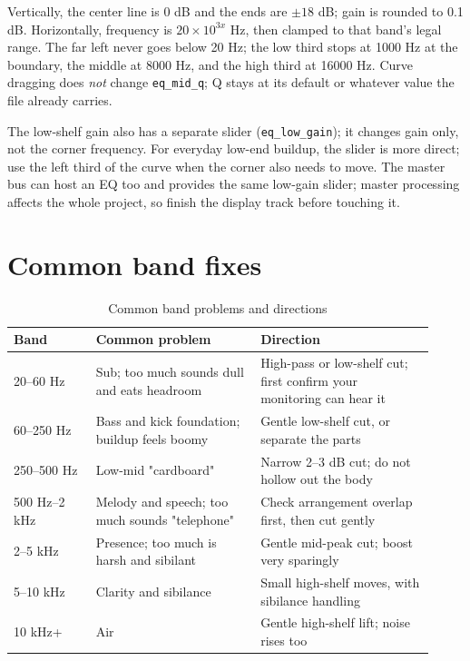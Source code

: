 Vertically, the center line is 0 dB and the ends are $\pm18$ dB; gain is rounded to 0.1 dB. Horizontally, frequency is $20\times10^{3x}$ Hz, then clamped to that band's legal range. The far left never goes below 20 Hz; the low third stops at 1000 Hz at the boundary, the middle at 8000 Hz, and the high third at 16000 Hz. Curve dragging does \emph{not} change \texttt{eq\_mid\_q}; Q stays at its default or whatever value the file already carries.

The low-shelf gain also has a separate slider (\texttt{eq\_low\_gain}); it changes gain only, not the corner frequency. For everyday low-end buildup, the slider is more direct; use the left third of the curve when the corner also needs to move. The master bus can host an EQ too and provides the same low-gain slider; master processing affects the whole project, so finish the display track before touching it.

\section{Common band fixes}

\begin{table}[htbp]
\centering
\small
\begin{tabular}{@{}p{0.18\linewidth}p{0.36\linewidth}p{0.38\linewidth}@{}}
\hline
Band & Common problem & Direction \\
\hline
20–60 Hz & Sub; too much sounds dull and eats headroom & High-pass or low-shelf cut; first confirm your monitoring can hear it \\
60–250 Hz & Bass and kick foundation; buildup feels boomy & Gentle low-shelf cut, or separate the parts \\
250–500 Hz & Low-mid "cardboard" & Narrow 2–3 dB cut; do not hollow out the body \\
500 Hz–2 kHz & Melody and speech; too much sounds "telephone" & Check arrangement overlap first, then cut gently \\
2–5 kHz & Presence; too much is harsh and sibilant & Gentle mid-peak cut; boost very sparingly \\
5–10 kHz & Clarity and sibilance & Small high-shelf moves, with sibilance handling \\
10 kHz+ & Air & Gentle high-shelf lift; noise rises too \\
\hline
\end{tabular}
\caption{Common band problems and directions}
\label{tab:eq-bands}
\end{table}


